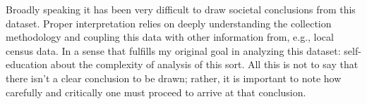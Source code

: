\documentclass[12pt]{article}
\begin{document}
\begin{enumerate}[leftmargin=\labelsep]
  Broadly speaking it has been very difficult to draw societal conclusions from this dataset. Proper interpretation relies
  on deeply understanding the collection methodology and coupling this data with other information from, e.g., local census
  data. In a sense that fulfills my original goal in analyzing this dataset: self-education about the complexity of analysis
  of this sort. All this is not to say that there isn't a clear conclusion to be drawn; rather, it is important to note how
  carefully and critically one must proceed to arrive at that conclusion.

\end{enumerate}
\end{document}
